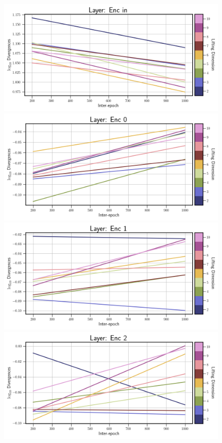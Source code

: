 \begin{figure}[!htbp]
    \centering
    \begin{minipage}{.5\textwidth}
        \includegraphics[width=\textwidth]{"../Figures/van_der_pol_div_plot_linear_enc_in.png"} 
        \includegraphics[width=\textwidth]{"../Figures/van_der_pol_div_plot_linear_enc_0.png"} 
        \includegraphics[width=\textwidth]{"../Figures/van_der_pol_div_plot_linear_enc_1.png"} 
        \includegraphics[width=\textwidth]{"../Figures/van_der_pol_div_plot_linear_enc_2.png"} 

\end{minipage}
\end{figure}
